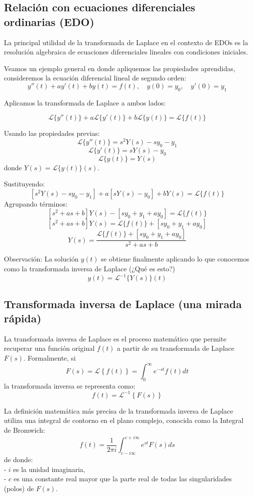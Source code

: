\documentclass{article}
\theoremstyle{nonumberplain}
\begin{document}
\subsection{Relación con ecuaciones diferenciales ordinarias (EDO)}

La principal utilidad de la transformada de Laplace en el contexto de EDOs es la resolución algebraica de ecuaciones diferenciales lineales con condiciones iniciales.

Veamos un ejemplo general en donde apliquemos las propiedades aprendidas, consideremos la ecuación diferencial lineal de segundo orden:
\[
y''(t) + a y'(t) + b y(t) = f(t), \quad y(0) = y_0, \quad y'(0) = y_1
\]

Aplicamos la transformada de Laplace a ambos lados:

\[
\mathcal{L}\{y''(t)\} + a \mathcal{L}\{y'(t)\} + b \mathcal{L}\{y(t)\} = \mathcal{L}\{f(t)\}
\]

Usando las propiedades previas:
\[
\mathcal{L}\{y''(t)\} = s^2 Y(s) - s y_0 - y_1
\]
\[
\mathcal{L}\{y'(t)\} = s Y(s) - y_0
\]
\[
\mathcal{L}\{y(t)\} = Y(s)
\]
donde \( Y(s) = \mathcal{L}\{y(t)\}(s) \).

Sustituyendo:
\[
[s^2 Y(s) - s y_0 - y_1] + a [s Y(s) - y_0] + b Y(s) = \mathcal{L}\{f(t)\}
\]
Agrupando términos:
\[
\left[ s^2 + a s + b \right] Y(s) - [s y_0 + y_1 + a y_0] = \mathcal{L}\{f(t)\}
\]
\[
\left[ s^2 + a s + b \right] Y(s) = \mathcal{L}\{f(t)\} + [s y_0 + y_1 + a y_0]
\]
\[
Y(s) = \frac{ \mathcal{L}\{f(t)\} + [s y_0 + y_1 + a y_0] }{ s^2 + a s + b }
\]

Observación:  
La solución \( y(t) \) se obtiene finalmente aplicando lo que conocemos como la transformada inversa de Laplace (¿Qué es esto?)
\[
y(t) = \mathcal{L}^{-1}\{ Y(s) \}(t)
\]

\subsection{Transformada inversa de Laplace (una mirada rápida)}
La transformada inversa de Laplace es el proceso matemático que permite recuperar una función original \( f(t) \) a partir de su transformada de Laplace \( F(s) \). Formalmente, si
\[
F(s) = \mathcal{L}\left\{f(t)\right\} = \int_{0}^{\infty} e^{-st} f(t) dt
\]
la transformada inversa se representa como:
\[
f(t) = \mathcal{L}^{-1}\left\{F(s)\right\}
\]

La definición matemática más precisa de la transformada inversa de Laplace utiliza una integral de contorno en el plano complejo, conocida como la Integral de Bromwich:
\[
f(t) = \frac{1}{2\pi i} \int_{c-i\infty}^{c+i\infty} e^{st} F(s) ds
\]
de donde: \\
- \( i \) es la unidad imaginaria, \\
- \( c \) es una constante real mayor que la parte real de todas las singularidades (polos) de \( F(s) \). \\
\end{document}
